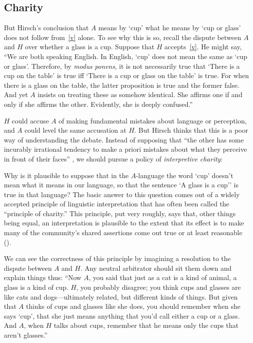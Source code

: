\documentclass[11pt]{article}
\newenvironment{squote}{%
\begin{spacing}{1}
       	\begin{list}{}{%
\setlength{\labelwidth}{0pt}%
\rightmargin\leftmargin%
}
\item\relax
}{%
\end{list}%
\end{spacing}
}
\begin{document}
\begin{spacing}{1.25}
\subsection{Charity}
\label{charity}
But Hirsch's conclusion that $A$ means by `cup' what he means by `cup
or glass' does not follow from~\ref{v} alone.  To see why this is so,
recall the dispute between $A$ and $H$ over whether a glass is a cup.
Suppose that $H$ accepts~\ref{v}.  He might say, ``We are both
speaking English.  In English, `cup' does not mean the same as `cup or
glass'. Therefore, by {\em modus ponens}, it is not necessarily true
that `There is a cup on the table' is true iff `There is a cup or
glass on the table' is true.  For when there is a glass on the table,
the latter proposition is true and the former false.  And yet $A$
insists on treating these as somehow identical.  She affirms one if
and only if she affirms the other.  Evidently, she is deeply
confused.''

$H$ could accuse $A$ of making fundamental mistakes about language or
perception, and $A$ could level the same accusation at $H$.  But
Hirsch thinks that this is a poor way of understanding the
debate.  Instead of supposing that ``the other has some incurably
irrational tendency to make a priori mistakes about what they perceive
in front of their faces'' \citep[78]{hirsch2005}, we should pursue a
policy of {\em interpretive charity}:

\begin{squote}
Why is it plausible to suppose that in the $A$-language the word `cup'
doesn't mean what it means in our language, so that the sentence `A
glass is a cup'' is true in that language?  The basic answer to this
question comes out of a widely accepted principle of linguistic
interpretation that has often been called the ``principle of
charity.''  This principle, put very roughly, says that, other things
being equal, an interpretation is plausible to the extent that its
effect is to make many of the community's shared assertions come out
true or at least reasonable (\citeyear[71]{hirsch2005}).
\end{squote}

We can see the correctness of this principle by imagining a resolution
to the dispute between $A$ and $H$.  Any neutral arbitrator should sit
them down and explain things thus: ``Now $A$, you said that just as a
cat is a kind of animal, a glass is a kind of cup.  $H$, you probably
disagree; you think cups and glasses are like cats and
dogs---ultimately related, but different kinds of things.  But given
that $A$ thinks of cups and glasses like she does, you should remember
when she says `cup', that she just means anything that you'd call
either a cup or a glass.  And $A$, when $H$ talks about cups, remember
that he means only the cups that aren't glasses.''


\end{spacing}
\end{document}
